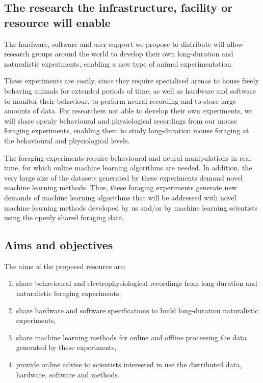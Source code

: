 \subsection{The research the infrastructure, facility or resource will enable}

The hardware, software and user support we propose to distribute will allow
research groups around the world to develop their own long-duration and
naturalistic experiments, enabling a new type of animal experimentation.

These experiments are costly, since they require specialised arenas to house
freely behaving animals for extended periods of time, as well as hardware and
software to monitor their behaviour, to perform neural recording and to store
large amounts of data. For researchers not able to develop their own
experiments, we will share openly behavioural and physiological recordings
from our mouse foraging experiments, enabling them to study long-duration mouse
foraging at the behavioural and physiological levels.

The foraging experiments require behavioural and neural manipulations in real
time, for which online machine learning algorithms are needed. In addition, the
very large size of the datasets generated by these experiments demand novel
machine learning methods. Thus, these foraging experiments generate new demands
of machine learning algorithms that will be addressed with novel machine
learning methods developed by us and/or by machine learning scientists using
the openly shared foraging data.

\subsection{Aims and objectives}

The aims of the proposed resource are:

\begin{enumerate}

    \item share behavioural and electrophysiological recordings from long-duration
        and naturalistic foraging experiments,

    \item share hardware and software specifications to build long-duration
        naturalistic experiments,

    \item share machine learning methods for online and offline processing the
        data generated by these experiments,

    \item provide online advise to scientists interested in use the distributed
        data, hardware, software and methods.

\end{enumerate}

